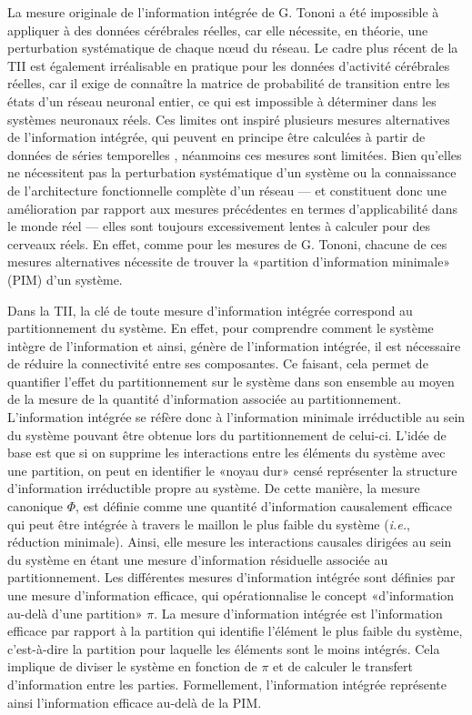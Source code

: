 La mesure originale de l'information intégrée de G. Tononi \citep{tononi2004information} a été impossible à appliquer à des données cérébrales réelles, car elle nécessite, en théorie, une perturbation systématique de chaque nœud du réseau. 
Le cadre plus récent de la TII \citep{oizumi2014phenomenology} est également irréalisable en pratique pour les données d'activité cérébrales réelles, car il exige de connaître la matrice de probabilité de transition entre les états d'un réseau neuronal entier, ce qui est impossible à déterminer dans les systèmes neuronaux réels. 
Ces limites ont inspiré plusieurs mesures alternatives de l'information intégrée, qui peuvent en principe être calculées à partir de données de séries temporelles \citep{seth2006theories, seth2005causal, barrett2011practical, oizumi2016measuring}, néanmoins ces mesures sont limitées. 
Bien qu'elles ne nécessitent pas la perturbation systématique d'un système ou la connaissance de l'architecture fonctionnelle complète d'un réseau --- et constituent donc une amélioration par rapport aux mesures précédentes en termes d'applicabilité dans le monde réel --- elles sont toujours excessivement lentes à calculer pour des cerveaux réels. 
En effet, comme pour les mesures de G. Tononi, chacune de ces mesures alternatives nécessite de trouver la «partition d'information minimale» (PIM) d'un système.

Dans la TII, la clé de toute mesure d’information intégrée correspond au partitionnement du système. 
En effet, pour comprendre comment le système intègre de l'information et ainsi, génère de l'information intégrée, il est nécessaire de réduire la connectivité entre ses composantes.  
Ce faisant, cela permet de quantifier l’effet du partitionnement sur le système dans son ensemble au moyen de la mesure de la quantité d'information associée au partitionnement. 
L’information intégrée se réfère donc à l'information minimale irréductible au sein du système pouvant être obtenue lors du partitionnement de celui-ci. 
L'idée de base est que si on supprime les interactions entre les éléments du système avec une partition, on peut en identifier le «noyau dur» censé représenter la structure d'information irréductible propre au système. 
De cette manière, la mesure canonique $\Phi$, est définie comme une quantité d’information causalement efficace qui peut être intégrée à travers le maillon le plus faible du système (\textit{i.e.}, réduction minimale). 
Ainsi, elle mesure les interactions causales dirigées au sein du système en étant une mesure d'information résiduelle associée au partitionnement. 
Les différentes mesures d’information intégrée sont définies par une mesure d’information efficace, qui opérationnalise le concept «d’information au-delà d’une partition» $\pi$. 
La mesure d'information intégrée est l’information efficace par rapport à la partition qui identifie l’élément le plus faible du système, c’est-à-dire la partition pour laquelle les éléments sont le moins intégrés. 
Cela implique de diviser le système en fonction de $\pi$ et de calculer le transfert d’information entre les parties. 
Formellement, l’information intégrée représente ainsi l’information efficace au-delà de la PIM.

